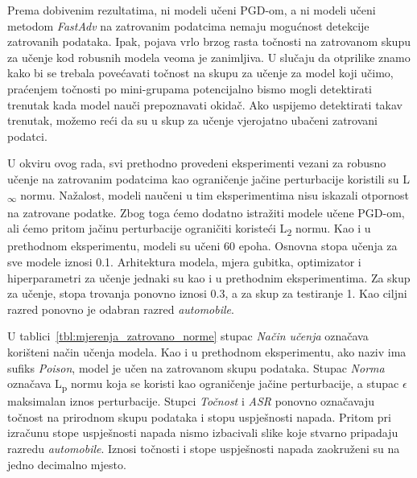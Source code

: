 \documentclass[times, utf8, zavrsni, numeric]{fer}
\begin{document}
Prema dobivenim rezultatima, ni modeli učeni PGD-om, a ni modeli učeni metodom \textit{FastAdv} na zatrovanim podatcima nemaju mogućnost detekcije zatrovanih podataka.
Ipak, pojava vrlo brzog rasta točnosti na zatrovanom skupu za učenje kod robusnih modela veoma je zanimljiva.
U slučaju da otprilike znamo kako bi se trebala povećavati točnost na skupu za učenje za model koji učimo, 
praćenjem točnosti po mini-grupama potencijalno bismo mogli detektirati trenutak kada model nauči prepoznavati okidač. 
Ako uspijemo detektirati takav trenutak, možemo reći da su u skup za učenje vjerojatno ubačeni zatrovani podatci.

\pagebreak

U okviru ovog rada, svi prethodno provedeni eksperimenti vezani za robusno učenje na zatrovanim podatcima kao ograničenje jačine perturbacije koristili su L\textsubscript{$\infty$} normu.
Nažalost, modeli naučeni u tim eksperimentima nisu iskazali otpornost na zatrovane podatke. 
Zbog toga ćemo dodatno istražiti modele učene PGD-om, ali ćemo pritom jačinu perturbacije ograničiti koristeći L\textsubscript{2} normu.
Kao i u prethodnom eksperimentu, modeli su učeni 60 epoha. Osnovna stopa učenja za sve modele iznosi 0.1. Arhitektura modela, mjera gubitka, optimizator i hiperparametri za učenje jednaki su kao i u prethodnim eksperimentima.
Za skup za učenje, stopa trovanja ponovno iznosi 0.3, a za skup za testiranje 1.
Kao ciljni razred ponovno je odabran razred \textit{automobile}.

U tablici~\ref{tbl:mjerenja_zatrovano_norme} stupac \textit{Način učenja} označava korišteni način učenja modela.
Kao i u prethodnom eksperimentu, ako naziv ima sufiks \textit{Poison}, model je učen na zatrovanom skupu podataka.
Stupac \textit{Norma} označava L\textsubscript{p} normu koja se koristi kao ograničenje jačine perturbacije, a stupac \textit{$\epsilon$} maksimalan iznos perturbacije.
Stupci \textit {Točnost} i \textit{ASR} ponovno označavaju točnost na prirodnom skupu podataka i stopu uspješnosti napada.
Pritom pri izračunu stope uspješnosti napada nismo izbacivali slike koje stvarno pripadaju razredu \textit{automobile}.
Iznosi točnosti i stope uspješnosti napada zaokruženi su na jedno decimalno mjesto.
\end{document}
